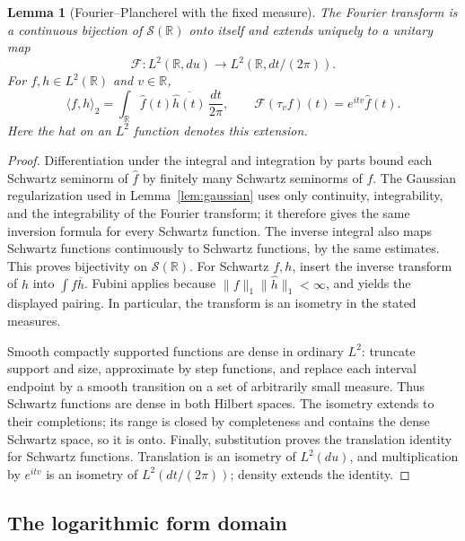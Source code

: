 \documentclass[11pt]{article}
\newtheorem{lemma}[theorem]{Lemma}
\theoremstyle{definition}
\theoremstyle{remark}
\numberwithin{equation}{section}
\newcommand{\R}{\mathbb R}
\begin{document}
\begin{lemma}[Fourier--Plancherel with the fixed measure]
\label{lem:prime-plancherel}
The Fourier transform is a continuous bijection of $\mathscr S(\R)$
onto itself and extends uniquely to a unitary map
\[
 \mathcal F:L^2(\R,du)\longrightarrow L^2(\R,dt/(2\pi)).
\]
For $f,h\in L^2(\R)$ and $v\in\R$,
\[
 \langle f,h\rangle_2
   =\int_{\R}\widehat f(t)\overline{\widehat h(t)}\,\frac{dt}{2\pi},
 \qquad \mathcal F(\tau_v f)(t)=e^{itv}\widehat f(t).
\]
Here the hat on an $L^2$ function denotes this extension.
\end{lemma}
\begin{proof}
Differentiation under the integral and integration by parts bound each
Schwartz seminorm of $\widehat f$ by finitely many Schwartz seminorms
of $f$.  The Gaussian regularization used in Lemma~\ref{lem:gaussian}
uses only continuity, integrability, and the integrability of the Fourier
transform; it therefore gives the same inversion formula for every
Schwartz function.  The inverse integral also maps Schwartz functions
continuously to Schwartz functions, by the same estimates.  This proves
bijectivity on $\mathscr S(\R)$.
For Schwartz $f,h$, insert the inverse transform of $h$ into
$\int f\overline h$.  Fubini applies because
$\|f\|_1\|\widehat h\|_1<\infty$, and yields the displayed pairing.
In particular, the transform is an isometry in the stated measures.

Smooth compactly supported functions are dense in ordinary $L^2$:
truncate support and size, approximate by step functions, and replace
each interval endpoint by a smooth transition on a set of arbitrarily
small measure.  Thus Schwartz functions are dense in both Hilbert spaces.
The isometry extends to their completions; its range is closed by
completeness and contains the dense Schwartz space, so it is onto.
Finally, substitution proves the translation identity for Schwartz
functions.  Translation is an isometry of $L^2(du)$, and multiplication
by $e^{itv}$ is an isometry of $L^2(dt/(2\pi))$; density extends the identity.
\end{proof}

\subsection{The logarithmic form domain}
\end{document}
